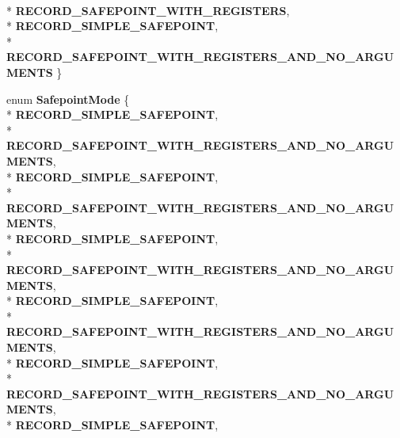 \begin{DoxyCompactItemize}
\\*
{\bfseries R\+E\+C\+O\+R\+D\+\_\+\+S\+A\+F\+E\+P\+O\+I\+N\+T\+\_\+\+W\+I\+T\+H\+\_\+\+R\+E\+G\+I\+S\+T\+E\+RS}, 
\\*
{\bfseries R\+E\+C\+O\+R\+D\+\_\+\+S\+I\+M\+P\+L\+E\+\_\+\+S\+A\+F\+E\+P\+O\+I\+NT}, 
\\*
{\bfseries R\+E\+C\+O\+R\+D\+\_\+\+S\+A\+F\+E\+P\+O\+I\+N\+T\+\_\+\+W\+I\+T\+H\+\_\+\+R\+E\+G\+I\+S\+T\+E\+R\+S\+\_\+\+A\+N\+D\+\_\+\+N\+O\+\_\+\+A\+R\+G\+U\+M\+E\+N\+TS}
 \}\hypertarget{classv8_1_1internal_1_1_l_code_gen_a166a08e2444941f7aec4c9748db666d0}{}\label{classv8_1_1internal_1_1_l_code_gen_a166a08e2444941f7aec4c9748db666d0}

\item 
enum {\bfseries Safepoint\+Mode} \{ \\*
{\bfseries R\+E\+C\+O\+R\+D\+\_\+\+S\+I\+M\+P\+L\+E\+\_\+\+S\+A\+F\+E\+P\+O\+I\+NT}, 
\\*
{\bfseries R\+E\+C\+O\+R\+D\+\_\+\+S\+A\+F\+E\+P\+O\+I\+N\+T\+\_\+\+W\+I\+T\+H\+\_\+\+R\+E\+G\+I\+S\+T\+E\+R\+S\+\_\+\+A\+N\+D\+\_\+\+N\+O\+\_\+\+A\+R\+G\+U\+M\+E\+N\+TS}, 
\\*
{\bfseries R\+E\+C\+O\+R\+D\+\_\+\+S\+I\+M\+P\+L\+E\+\_\+\+S\+A\+F\+E\+P\+O\+I\+NT}, 
\\*
{\bfseries R\+E\+C\+O\+R\+D\+\_\+\+S\+A\+F\+E\+P\+O\+I\+N\+T\+\_\+\+W\+I\+T\+H\+\_\+\+R\+E\+G\+I\+S\+T\+E\+R\+S\+\_\+\+A\+N\+D\+\_\+\+N\+O\+\_\+\+A\+R\+G\+U\+M\+E\+N\+TS}, 
\\*
{\bfseries R\+E\+C\+O\+R\+D\+\_\+\+S\+I\+M\+P\+L\+E\+\_\+\+S\+A\+F\+E\+P\+O\+I\+NT}, 
\\*
{\bfseries R\+E\+C\+O\+R\+D\+\_\+\+S\+A\+F\+E\+P\+O\+I\+N\+T\+\_\+\+W\+I\+T\+H\+\_\+\+R\+E\+G\+I\+S\+T\+E\+R\+S\+\_\+\+A\+N\+D\+\_\+\+N\+O\+\_\+\+A\+R\+G\+U\+M\+E\+N\+TS}, 
\\*
{\bfseries R\+E\+C\+O\+R\+D\+\_\+\+S\+I\+M\+P\+L\+E\+\_\+\+S\+A\+F\+E\+P\+O\+I\+NT}, 
\\*
{\bfseries R\+E\+C\+O\+R\+D\+\_\+\+S\+A\+F\+E\+P\+O\+I\+N\+T\+\_\+\+W\+I\+T\+H\+\_\+\+R\+E\+G\+I\+S\+T\+E\+R\+S\+\_\+\+A\+N\+D\+\_\+\+N\+O\+\_\+\+A\+R\+G\+U\+M\+E\+N\+TS}, 
\\*
{\bfseries R\+E\+C\+O\+R\+D\+\_\+\+S\+I\+M\+P\+L\+E\+\_\+\+S\+A\+F\+E\+P\+O\+I\+NT}, 
\\*
{\bfseries R\+E\+C\+O\+R\+D\+\_\+\+S\+A\+F\+E\+P\+O\+I\+N\+T\+\_\+\+W\+I\+T\+H\+\_\+\+R\+E\+G\+I\+S\+T\+E\+R\+S\+\_\+\+A\+N\+D\+\_\+\+N\+O\+\_\+\+A\+R\+G\+U\+M\+E\+N\+TS}, 
\\*
{\bfseries R\+E\+C\+O\+R\+D\+\_\+\+S\+I\+M\+P\+L\+E\+\_\+\+S\+A\+F\+E\+P\+O\+I\+NT}, 

\end{DoxyCompactItemize}
